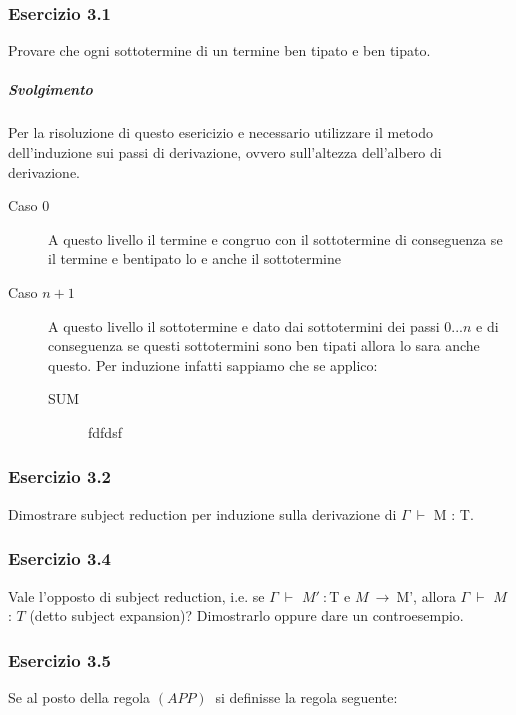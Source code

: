  
 
\subsubsection*{Esercizio 3.1}
Provare che ogni sottotermine di un termine ben tipato e ben tipato.
\subparagraph{Svolgimento}
Per la risoluzione di questo esericizio e necessario utilizzare il metodo dell'induzione sui passi di derivazione, ovvero sull'altezza dell'albero di derivazione.

\begin{description}

 \item[Caso $0$] A questo livello il termine e congruo con il sottotermine di conseguenza se il termine e bentipato lo e anche il sottotermine

 \item[Caso $n+1$ ] A questo livello il sottotermine e dato dai sottotermini dei passi $0$...$n$ e di conseguenza se questi sottotermini sono ben tipati allora lo sara anche questo.
 Per induzione infatti sappiamo che se applico:
 \begin{description}
 \item[SUM] fdfdsf
 \end{description}

\end{description}
 
\subsubsection*{Esercizio 3.2} 
Dimostrare subject reduction per induzione sulla derivazione di $\Gamma\:\vdash$ M : T.

\subsubsection*{Esercizio 3.4}

Vale l'opposto di subject reduction, i.e. se $\Gamma\:\vdash$ $M'\: :  $T e $M\:\rightarrow\:$M', allora $\Gamma\:\vdash$ $M$ : $T$ (detto subject expansion)? Dimostrarlo oppure dare un controesempio.

\subsubsection*{Esercizio 3.5}
Se al posto della regola $(APP)\:$ si definisse la regola seguente:

\begin{prooftree} 
	
\end{prooftree} 

